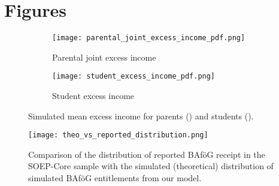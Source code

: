 \newpage
\section{Figures}
\renewcommand{\thefigure}{\thesection \arabic{figure}}
\setcounter{figure}{0}

\begin{figure}[htbp]
  \centering
  \begin{subfigure}[t]{0.48\linewidth}
    \texttt{[image: parental\_joint\_excess\_income\_pdf.png]}
    \caption{Parental joint excess income}
    \label{fig:parental-excess}
  \end{subfigure}
  \hfill
  \begin{subfigure}[t]{0.48\linewidth}
    \texttt{[image: student\_excess\_income\_pdf.png]}
    \caption{Student excess income}
    \label{fig:student-excess}
  \end{subfigure}
  \caption{Simulated mean excess income for parents () and students ().}
  \label{fig:excess-income}
\end{figure}


\begin{figure}[htbp]
  \centering
  \texttt{[image: theo\_vs\_reported\_distribution.png]}
  \caption{Comparison of the distribution of reported BAföG receipt in the SOEP-Core sample with the simulated (theoretical) distribution of simulated BAföG entitlements from our model.}
  \label{fig:theo-vs-reported}
\end{figure}


%
%
